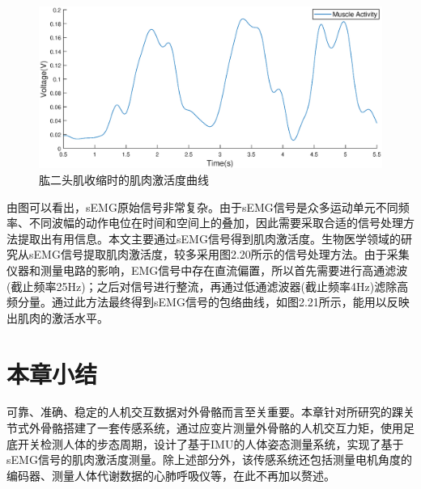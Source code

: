 \begin{figure}[!htb]
    \includegraphics[width=17cm]{fig/f46.eps}
    \caption{肱二头肌收缩时的肌肉激活度曲线}
    \label{fig:mark}
\end{figure}

由图可以看出，sEMG原始信号非常复杂。由于sEMG信号是众多运动单元不同频率、不同波幅的动作电位在时间和空间上的叠加，因此需要采取合适的信号处理方法提取出有用信息。本文主要通过sEMG信号得到肌肉激活度。生物医学领域的研究从sEMG信号提取肌肉激活度\cite{p45}，较多采用图2.20所示的信号处理方法。由于采集仪器和测量电路的影响，EMG信号中存在直流偏置，所以首先需要进行高通滤波(截止频率25Hz)；之后对信号进行整流，再通过低通滤波器(截止频率4Hz)滤除高频分量。通过此方法最终得到sEMG信号的包络曲线，如图2.21所示，能用以反映出肌肉的激活水平。

\section{本章小结}
可靠、准确、稳定的人机交互数据对外骨骼而言至关重要。本章针对所研究的踝关节式外骨骼搭建了一套传感系统，通过应变片测量外骨骼的人机交互力矩，使用足底开关检测人体的步态周期，设计了基于IMU的人体姿态测量系统，实现了基于sEMG信号的肌肉激活度测量。除上述部分外，该传感系统还包括测量电机角度的编码器、测量人体代谢数据的心肺呼吸仪等，在此不再加以赘述。
